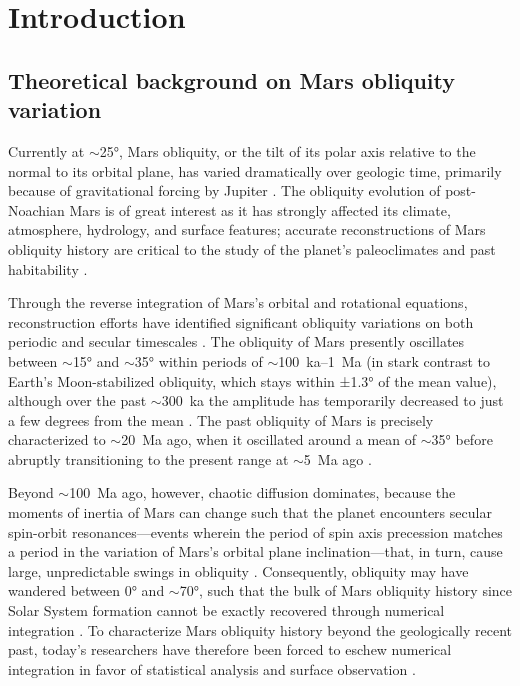 \documentclass{ucetd}
\begin{document}
\chapter{Introduction}
\label{chapter:1}

\section{Theoretical background on Mars obliquity variation}
\label{section:1-1}

Currently at $\sim$25°, Mars obliquity, or the tilt of its polar axis relative to the normal to its orbital plane, has varied dramatically over geologic time, primarily because of gravitational forcing by Jupiter \citep{laskar2004a}. The obliquity evolution of post-Noachian Mars is of great interest as it has strongly affected its climate, atmosphere, hydrology, and surface features; accurate reconstructions of Mars obliquity history are critical to the study of the planet’s paleoclimates and past habitability \citep{ward1973a, jakosky1985a, laskar2004a}.

Through the reverse integration of Mars’s orbital and rotational equations, reconstruction efforts have identified significant obliquity variations on both periodic and secular timescales \citep{ward1973a, touma1993a, laskar1993a, laskar2004a}. The obliquity of Mars presently oscillates between $\sim$15° and $\sim$35° within periods of $\sim$100~ka--1~Ma (in stark contrast to Earth’s Moon-stabilized obliquity, which stays within ±1.3° of the mean value), although over the past $\sim$300~ka the amplitude has temporarily decreased to just a few degrees from the mean \citep{laskar2004a}. The past obliquity of Mars is precisely characterized to $\sim$20~Ma ago, when it oscillated around a mean of $\sim$35° before abruptly transitioning to the present range at $\sim$5~Ma ago \citep{laskar2004a, laskar2010a}.

Beyond $\sim$100~Ma ago, however, chaotic diffusion dominates, because the moments of inertia of Mars can change such that the planet encounters secular spin-orbit resonances---events wherein the period of spin axis precession matches a period in the variation of Mars’s orbital plane inclination---that, in turn, cause large, unpredictable swings in obliquity \citep{ward1979b}. Consequently, obliquity may have wandered between 0° and $\sim$70°, such that the bulk of Mars obliquity history since Solar System formation cannot be exactly recovered through numerical integration \citep{touma1993a, laskar1993a, laskar2004a}. To characterize Mars obliquity history beyond the geologically recent past, today’s researchers have therefore been forced to eschew numerical integration in favor of statistical analysis and surface observation \citep[e.g.,][]{laskar2004a, holo2018a}.
\end{document}
